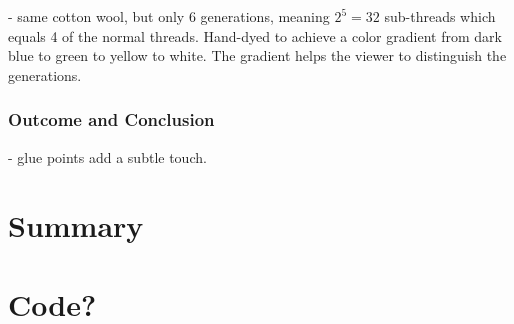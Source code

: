 \documentclass{scrartcl}
\begin{document}
- same cotton wool, but only 6 generations, meaning $2^5 = 32$ sub-threads which equals 4 of the normal threads. Hand-dyed to achieve a color gradient from dark blue to green to yellow to white. The gradient helps the viewer to distinguish the generations.

\subsubsection{Outcome and Conclusion}
- glue points add a subtle touch.

\section{Summary}




\newpage
\section*{Code?}


%
%
\end{document}

